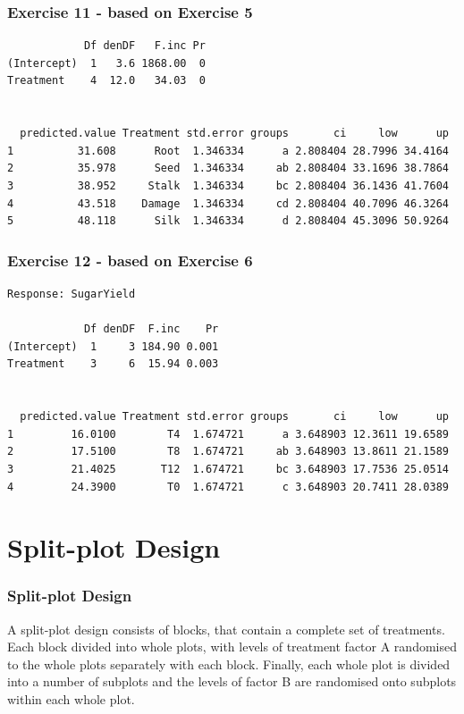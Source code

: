 \begin{frame}[fragile]\frametitle{Exercise 11 - based on Exercise 5}
\begin{verbatim}
            Df denDF   F.inc Pr
(Intercept)  1   3.6 1868.00  0
Treatment    4  12.0   34.03  0


  predicted.value Treatment std.error groups       ci     low      up
1          31.608      Root  1.346334      a 2.808404 28.7996 34.4164
2          35.978      Seed  1.346334     ab 2.808404 33.1696 38.7864
3          38.952     Stalk  1.346334     bc 2.808404 36.1436 41.7604
4          43.518    Damage  1.346334     cd 2.808404 40.7096 46.3264
5          48.118      Silk  1.346334      d 2.808404 45.3096 50.9264

\end{verbatim}
\end{frame}


\begin{frame}[fragile]\frametitle{Exercise 12 - based on Exercise 6}
\begin{verbatim}
Response: SugarYield

            Df denDF  F.inc    Pr
(Intercept)  1     3 184.90 0.001
Treatment    3     6  15.94 0.003


  predicted.value Treatment std.error groups       ci     low      up
1         16.0100        T4  1.674721      a 3.648903 12.3611 19.6589
2         17.5100        T8  1.674721     ab 3.648903 13.8611 21.1589
3         21.4025       T12  1.674721     bc 3.648903 17.7536 25.0514
4         24.3900        T0  1.674721      c 3.648903 20.7411 28.0389
\end{verbatim}
\end{frame}



\section{Split-plot Design}
\begin{frame}\frametitle{Split-plot Design}
A split-plot design consists of blocks, that contain a complete set of treatments.  Each block divided into whole
plots, with levels of treatment factor A randomised to the whole plots separately with each block. Finally, each whole
plot is divided into a number of subplots and the levels of factor B are randomised onto subplots within each whole
plot.

\end{frame}


